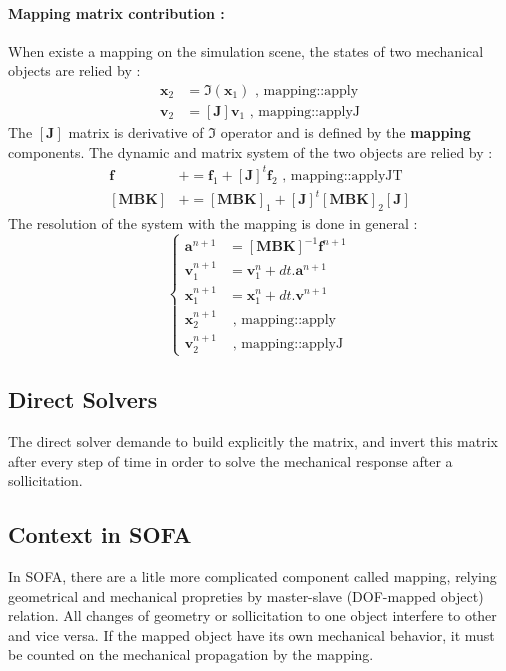 \documentclass[a4paper,10pt]{article}
\begin{document}
\paragraph{Mapping matrix contribution : } When existe a mapping on the simulation scene, the states of two mechanical objects are relied by : 
\[
\begin{array}{rl}
\textbf{x}_{2} & = \Im\left(\textbf{x}_{1}\right)           \text{      ,	mapping::apply}             \\
\textbf{v}_{2} & = \left[\textbf{J}\right] \textbf{v}_{1}   \text{      ,	mapping::applyJ}  
\end{array}
\]
The $\left[\textbf{J}\right]$ matrix is derivative of $\Im$ operator and is defined by the \textbf{\color{orange}mapping} components. The dynamic and matrix system of the two objects are relied by :   
\[
\begin{array}{rl}
\textbf{f}                  & += \textbf{f}_{1}  +   \left[\textbf{J}\right]^{t} \textbf{f}_{2}         \text{      ,	mapping::applyJT}             \\
\left[ \textbf{MBK} \right] & += \left[ \textbf{MBK} \right]_{1}  + \left[\textbf{J}\right]^{t}  \left[ \textbf{MBK} \right]_{2} \left[\textbf{J}\right]
\end{array}
\]
The resolution of the system with the mapping is done in general :
\[
\left\{ 
\begin{array}{rl}
\textbf{a}^{n+1}        & = \left[ \textbf{MBK} \right]^{-1}  \textbf{f}^{n+1}    \\
\textbf{v}^{n+1}_{1}    & = \textbf{v}^{n}_{1}     + dt.\textbf{a}^{n+1}         \\
\textbf{x}^{n+1}_{1}    & = \textbf{x}^{n}_{1}     + dt.\textbf{v}^{n+1}         \\
\textbf{x}^{n+1}_{2}    &  \text{ ,	mapping::apply }     \\
\textbf{v}^{n+1}_{2}    &  \text{ ,	mapping::applyJ }          
\end{array}
\right.
\]



\subsection{Direct Solvers }
The direct solver demande to build explicitly the matrix, and invert this matrix after every step of time in order to solve the mechanical response after a sollicitation.
\subsection{Context in SOFA }
In SOFA, there are a litle more complicated component called mapping, relying geometrical and mechanical propreties by master-slave (DOF-mapped object) relation. All changes of geometry or sollicitation to one object interfere to other and vice versa. If the mapped object have its own mechanical behavior, it must be counted on the mechanical propagation by the mapping.
\end{document}
